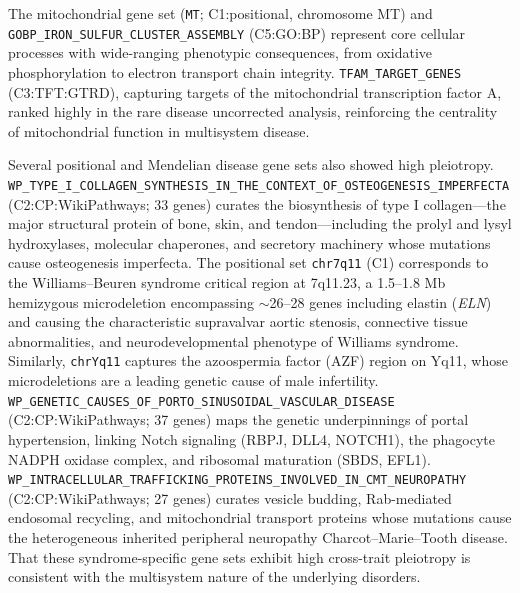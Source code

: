 The mitochondrial gene set (\texttt{MT}; C1:positional, chromosome MT) and \texttt{GOBP\_IRON\_SULFUR\_CLUSTER\_ASSEMBLY} (C5:GO:BP) represent core cellular processes with wide-ranging phenotypic consequences, from oxidative phosphorylation to electron transport chain integrity. \texttt{TFAM\_TARGET\_GENES} (C3:TFT:GTRD), capturing targets of the mitochondrial transcription factor A, ranked highly in the rare disease uncorrected analysis, reinforcing the centrality of mitochondrial function in multisystem disease.

Several positional and Mendelian disease gene sets also showed high pleiotropy. \texttt{WP\_TYPE\_I\_COLLAGEN\_SYNTHESIS\_IN\_THE\_CONTEXT\_OF\_OSTEOGENESIS\_IMPERFECTA} (C2:CP:WikiPathways; 33 genes) curates the biosynthesis of type I collagen---the major structural protein of bone, skin, and tendon---including the prolyl and lysyl hydroxylases, molecular chaperones, and secretory machinery whose mutations cause osteogenesis imperfecta\cite{forlino_osteogenesis_2016}. The positional set \texttt{chr7q11} (C1) corresponds to the Williams--Beuren syndrome critical region at 7q11.23, a 1.5--1.8 Mb hemizygous microdeletion encompassing $\sim$26--28 genes including elastin (\textit{ELN}) and causing the characteristic supravalvar aortic stenosis, connective tissue abnormalities, and neurodevelopmental phenotype of Williams syndrome\cite{morris_williams_2023}. Similarly, \texttt{chrYq11} captures the azoospermia factor (AZF) region on Yq11, whose microdeletions are a leading genetic cause of male infertility\cite{vogt_azf_1996}. \texttt{WP\_GENETIC\_CAUSES\_OF\_PORTO\_SINUSOIDAL\_VASCULAR\_DISEASE} (C2:CP:WikiPathways; 37 genes) maps the genetic underpinnings of portal hypertension, linking Notch signaling (RBPJ, DLL4, NOTCH1), the phagocyte NADPH oxidase complex, and ribosomal maturation (SBDS, EFL1)\cite{hernandez-gea_psvd_2020}. \texttt{WP\_INTRACELLULAR\_TRAFFICKING\_PROTEINS\_INVOLVED\_IN\_CMT\_NEUROPATHY} (C2:CP:WikiPathways; 27 genes) curates vesicle budding, Rab-mediated endosomal recycling, and mitochondrial transport proteins whose mutations cause the heterogeneous inherited peripheral neuropathy Charcot--Marie--Tooth disease\cite{bucci_cmt_2012}. That these syndrome-specific gene sets exhibit high cross-trait pleiotropy is consistent with the multisystem nature of the underlying disorders.

